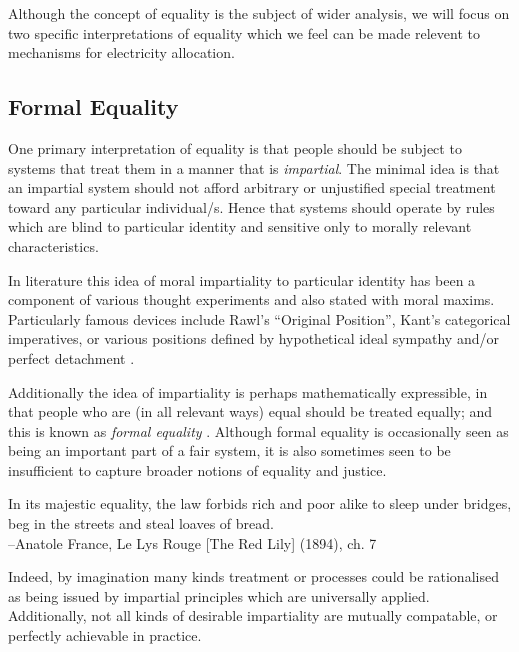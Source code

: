 Although the concept of equality is the subject of wider analysis, we will focus on two specific interpretations of equality which we feel can be made relevent to mechanisms for electricity allocation.

\subsection{Formal Equality}\label{sec:formal_equality}

One primary interpretation of equality is that people should be subject to systems that treat them in a manner that is \textit{impartial}. The minimal idea is that an impartial system should not afford arbitrary or unjustified special treatment toward any particular individual/s. Hence that systems should operate by rules which are blind to particular identity and sensitive only to morally relevant characteristics.

In literature this idea of moral impartiality to particular identity has been a component of various thought experiments and also stated with moral maxims.
Particularly famous devices include Rawl's ``Original Position'', Kant's categorical imperatives, or various positions defined by hypothetical ideal sympathy and/or perfect detachment \cite{smithGutenberg, nla.cat-vn197822,10.2307/2103988}.

Additionally the idea of impartiality is perhaps mathematically expressible, in that people who are (in all relevant ways) equal should be treated equally; and this is known as \textit{formal equality} \cite{whatisbasicequalitynathan}. Although formal equality is occasionally seen as being an important part of a fair system, it is also sometimes seen to be insufficient to capture broader notions of equality and justice.

\begin{displayquote}
In its majestic equality, the law forbids rich and poor alike to sleep under bridges, beg in the streets and steal loaves of bread.\\
--Anatole France, Le Lys Rouge [The Red Lily] (1894), ch. 7
\end{displayquote}

Indeed, by imagination many kinds treatment or processes could be rationalised as being issued by impartial principles which are universally applied. Additionally, not all kinds of desirable impartiality are mutually compatable, or perfectly achievable in practice.\cite{Hutchinson_2019}

